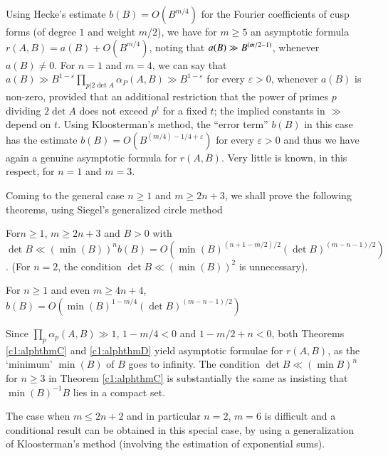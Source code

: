 Using Hecke's estimate $b(B)=O(B^{m/4})$ for the Fourier coefficients
of cusp forms (of degree $1$ and weight $m/2$), we have for $m\geq 5$
an asymptotic formula $r(A,B)=a(B)+O(B^{m/4})$, noting that $a(B)\gg
\break B^{(m/2-1)}$, whenever $a(B)\neq 0$. For $n=1$ and $m=4$, we can say
that $a(B)\gg B^{1-\varepsilon}\prod\limits_{p|2\det A}\alpha_{P}(A,B)\gg
B^{1-\varepsilon}$ for every $\varepsilon>0$, whenever $a(B)$ is non-zero,
provided that an additional restriction that the power of primes $p$
dividing $2\det A$ does not exceed $p^{t}$ for a fixed $t$; the
implied constants in $\gg$ depend on $t$. Using Kloosterman's method,
the ``error term'' $b(B)$ in this case has the estimate
$b(B)=O(B^{(m/4)-1/4+\varepsilon})$ for every $\varepsilon>0$ and thus we
have again a genuine asymptotic formula for $r(A,B)$. Very little is
known, in this respect, for $n=1$ and $m=3$.

Coming to the general case $n\geq 1$ and $m\geq 2n+3$, we shall prove
the following theorems, using Siegel's generalized circle method 

\begin{alphtheorem}\label{c1:alphthmC}
For\pageoriginale $n\geq 1$, $m\geq 2n+3$ and $B>0$ with $\det B\ll (\min
(B))^{n}b(B)=O(\min(B)^{(n+1-m/2)/2}(\det B)^{(m-n-1)/2})$. (For
$n=2$, the condition $\det B\ll (\min(B))^{2}$ is unnecessary).
\end{alphtheorem}

\begin{alphtheorem}\label{c1:alphthmD}
For $n\geq 1$ and even $m\geq 4n+4$, $b(B)=O(\min(B)^{1-m/4}(\det
B)^{(m-n-1)/2})$ 
\end{alphtheorem}

\setcounter{remarks}{5}
\begin{remarks}\label{c1:rems6}
Since $\prod\limits_{p}\alpha_{p}(A,B)\gg 1$, $1-m/4<0$ and
$1-m/2+n<0$, both Theorems \ref{c1:alphthmC} and \ref{c1:alphthmD} yield
asymptotic formulae for $r(A,B)$, as the `minimum' $\min(B)$ of $B$
goes to infinity. The condition $\det B\ll (\min B)^{n}$ for $n\geq 3$
in Theorem \ref{c1:alphthmC} is substantially the same as insisting that
$\min(B)^{-1}B$ lies in a compact set.
\end{remarks}

The case when $m\leq 2n+2$ and in particular $n=2$, $m=6$ is difficult
and a conditional result can be obtained in this special case, by
using a generalization of Kloosterman's method (involving the
estimation of exponential sums).

